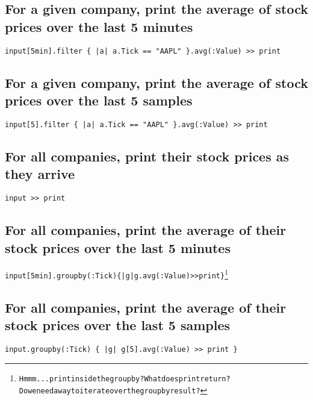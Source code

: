 \documentclass[twoside]{report}
\begin{document}
\subsection{For a given company, print the average of stock prices over the last 5 minutes}
\begin{verbatim}
input[5min].filter { |a| a.Tick == "AAPL" }.avg(:Value) >> print
\end{verbatim}

\subsection{For a given company, print the average of stock prices over the last 5 samples}
\begin{verbatim}
input[5].filter { |a| a.Tick == "AAPL" }.avg(:Value) >> print
\end{verbatim}

\subsection{For all companies, print their stock prices as they arrive}
\begin{verbatim}
input >> print
\end{verbatim}

\subsection{For all companies, print the average of their stock prices over the last 5 minutes}
\begin{alltt}
input[5min].groupby(:Tick) \{ |g| g.avg(:Value) >> print \}\footnote{Hmmm... print inside the groupby? What does print return? Do we need a way to iterate over the groupby result?}
\end{alltt}

\subsection{For all companies, print the average of their stock prices over the last 5 samples}
\begin{verbatim}
input.groupby(:Tick) { |g| g[5].avg(:Value) >> print }
\end{verbatim}
\end{document}
